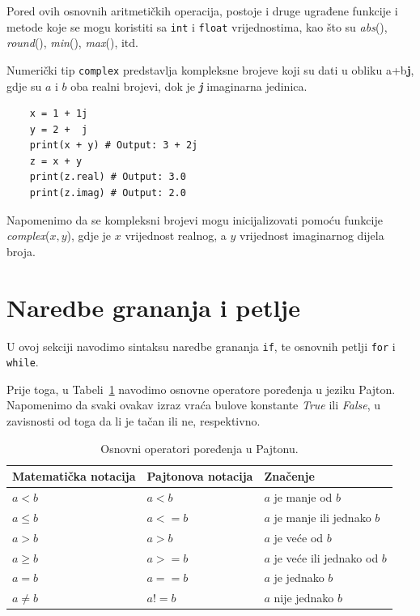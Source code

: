 Pored ovih osnovnih aritmetičkih operacija, postoje i druge ugrađene funkcije i metode koje se mogu koristiti sa \texttt{int} i \texttt{float} vrijednostima, kao što su \textit{abs}(), \textit{round}(), \textit{min}(), \textit{max}(), itd.

Numerički tip \texttt{complex} predstavlja kompleksne brojeve koji su dati u obliku a+b\textbf{j}, gdje su $a$ i $b$ oba realni brojevi, dok je  \textbf{\textit{j}} imaginarna jedinica.
\begin{verbatim}
	x = 1 + 1j 
	y = 2 +  j 
	print(x + y) # Output: 3 + 2j
	z = x + y
	print(z.real) # Output: 3.0
	print(z.imag) # Output: 2.0
\end{verbatim}
Napomenimo da se kompleksni brojevi mogu inicijalizovati pomoću funkcije  \textit{complex}($x, y$), gdje je $x$ vrijednost realnog, a $y$ vrijednost imaginarnog dijela broja. 


\section{Naredbe grananja i petlje}
U ovoj sekciji navodimo sintaksu naredbe grananja \texttt{if}, te osnovnih petlji \texttt{for} i \texttt{while}. 

Prije toga, u Tabeli~\ref{fig: operatori_poredjenja} navodimo osnovne operatore poređenja u jeziku Pajton. Napomenimo da svaki ovakav izraz vraća bulove konstante \emph{True} ili \emph{False}, u zavisnosti od toga da li je tačan ili ne, respektivno. 


\begin{table}
		\caption{Osnovni operatori poređenja u Pajtonu.}	\label{fig: operatori_poredjenja}
	\hline
	\centering
	\begin{tabular}{lll}
		Matematička notacija & Pajtonova notacija & Značenje \\ \hline
		$a < b$              &  $a < b$           & $a$ je manje od $b$ \\
		 $a \leq b$          &  $a <= b$          &$ a$ je manje ili jednako $b$ \\  
		 $a > b$             &   $a >b$           & $a$ je veće od $b$   \\
		 $a \geq b$          &   $a >= b$         & $a$ je veće ili jednako od $b$   \\
		 $a=b$               &   $a==b$           & $a$ je jednako $b$               \\
		 $a \neq b$          & $a!=b$             &  $a$ nije jednako $b$            \\ \hline    
  	\end{tabular} 
\end{table}


